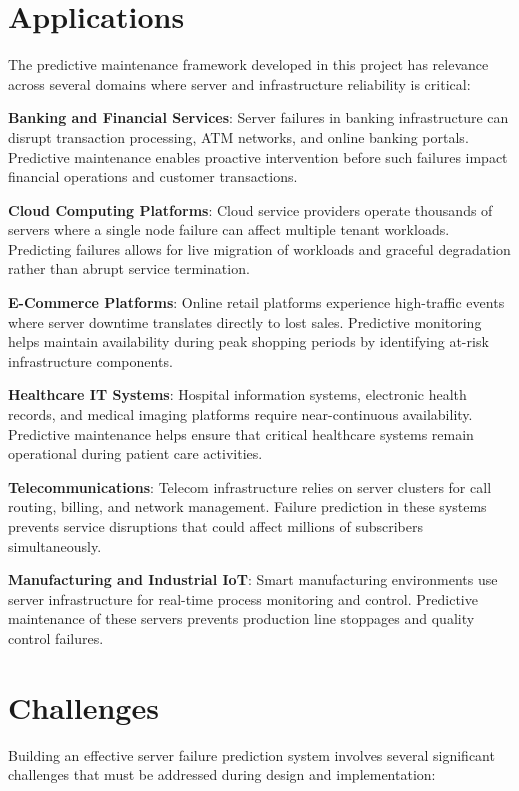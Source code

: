 \documentclass[12pt,letterpaper]{report}
\begin{document}
\section{Applications}

The predictive maintenance framework developed in this project has relevance across several domains where server and infrastructure reliability is critical:

\textbf{Banking and Financial Services}: Server failures in banking infrastructure can disrupt transaction processing, ATM networks, and online banking portals. Predictive maintenance enables proactive intervention before such failures impact financial operations and customer transactions.

\textbf{Cloud Computing Platforms}: Cloud service providers operate thousands of servers where a single node failure can affect multiple tenant workloads. Predicting failures allows for live migration of workloads and graceful degradation rather than abrupt service termination.

\textbf{E-Commerce Platforms}: Online retail platforms experience high-traffic events where server downtime translates directly to lost sales. Predictive monitoring helps maintain availability during peak shopping periods by identifying at-risk infrastructure components.

\textbf{Healthcare IT Systems}: Hospital information systems, electronic health records, and medical imaging platforms require near-continuous availability. Predictive maintenance helps ensure that critical healthcare systems remain operational during patient care activities.

\textbf{Telecommunications}: Telecom infrastructure relies on server clusters for call routing, billing, and network management. Failure prediction in these systems prevents service disruptions that could affect millions of subscribers simultaneously.

\textbf{Manufacturing and Industrial IoT}: Smart manufacturing environments use server infrastructure for real-time process monitoring and control. Predictive maintenance of these servers prevents production line stoppages and quality control failures.

\section{Challenges}

Building an effective server failure prediction system involves several significant challenges that must be addressed during design and implementation:
\end{document}
